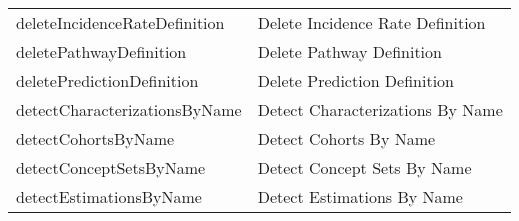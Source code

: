 \documentclass[
]{article}
\begin{document}
\begin{longtable}[]{@{}ll@{}}
\begin{minipage}[t]{0.46\columnwidth}\raggedright
deleteIncidenceRateDefinition\strut
\end{minipage} & \begin{minipage}[t]{0.48\columnwidth}\raggedright
Delete Incidence Rate Definition\strut
\end{minipage}\tabularnewline
\begin{minipage}[t]{0.46\columnwidth}\raggedright
deletePathwayDefinition\strut
\end{minipage} & \begin{minipage}[t]{0.48\columnwidth}\raggedright
Delete Pathway Definition\strut
\end{minipage}\tabularnewline
\begin{minipage}[t]{0.46\columnwidth}\raggedright
deletePredictionDefinition\strut
\end{minipage} & \begin{minipage}[t]{0.48\columnwidth}\raggedright
Delete Prediction Definition\strut
\end{minipage}\tabularnewline
\begin{minipage}[t]{0.46\columnwidth}\raggedright
detectCharacterizationsByName\strut
\end{minipage} & \begin{minipage}[t]{0.48\columnwidth}\raggedright
Detect Characterizations By Name\strut
\end{minipage}\tabularnewline
\begin{minipage}[t]{0.46\columnwidth}\raggedright
detectCohortsByName\strut
\end{minipage} & \begin{minipage}[t]{0.48\columnwidth}\raggedright
Detect Cohorts By Name\strut
\end{minipage}\tabularnewline
\begin{minipage}[t]{0.46\columnwidth}\raggedright
detectConceptSetsByName\strut
\end{minipage} & \begin{minipage}[t]{0.48\columnwidth}\raggedright
Detect Concept Sets By Name\strut
\end{minipage}\tabularnewline
\begin{minipage}[t]{0.46\columnwidth}\raggedright
detectEstimationsByName\strut
\end{minipage} & \begin{minipage}[t]{0.48\columnwidth}\raggedright
Detect Estimations By Name\strut
\end{minipage}\tabularnewline

\end{longtable}
\end{document}
